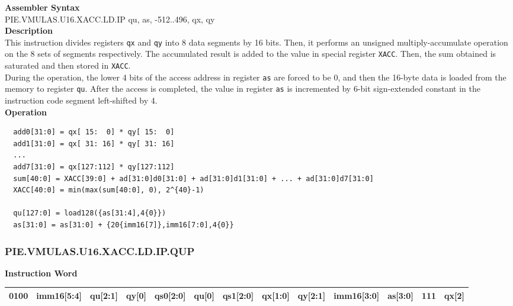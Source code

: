 \textbf{Assembler Syntax} \\
PIE.VMULAS.U16.XACC.LD.IP qu, as, -512..496, qx, qy \\
\textbf{Description} \\
This instruction divides registers \lstinline{qx} and \lstinline{qy} into 8 data segments by 16 bits. Then, it performs an unsigned multiply-accumulate operation on the 8 sets of segments respectively. The accumulated result is added to the value in special register \lstinline{XACC}. Then, the sum obtained is saturated and then stored in \lstinline{XACC}. \\ During the operation, the lower 4 bits of the access address in register \lstinline{as} are forced to be 0, and then the 16-byte data is loaded from the memory to register \lstinline{qu}. After the access is completed, the value in register \lstinline{as} is incremented by 6-bit sign-extended constant in the instruction code segment left-shifted by 4.\\
\textbf{Operation}
\begin{lstlisting}
  add0[31:0] = qx[ 15:  0] * qy[ 15:  0]
  add1[31:0] = qx[ 31: 16] * qy[ 31: 16]
  ...
  add7[31:0] = qx[127:112] * qy[127:112]
  sum[40:0] = XACC[39:0] + ad[31:0]d0[31:0] + ad[31:0]d1[31:0] + ... + ad[31:0]d7[31:0]
  XACC[40:0] = min(max(sum[40:0], 0), 2^{40}-1)

  qu[127:0] = load128({as[31:4],4{0}})
  as[31:0] = as[31:0] + {20{imm16[7]},imm16[7:0],4{0}}
\end{lstlisting}

\newpage
\subsubsection{PIE.VMULAS.U16.XACC.LD.IP.QUP}\label{instruction:PIEVMULASU16XACCLDIPQUP}
\setlength\tabcolsep{5pt}
\textbf{Instruction Word} \\
\begin{tabular}{|c|c|c|c|c|c|c|c|c|c|c|c|c|}
	\hline
	0100 & imm16[5:4] & qu[2:1] & qy[0] & qs0[2:0] & qu[0] & qs1[2:0] & qx[1:0] & qy[2:1] & imm16[3:0] & as[3:0] & 111 & qx[2] \\
	\hline
\end{tabular}

